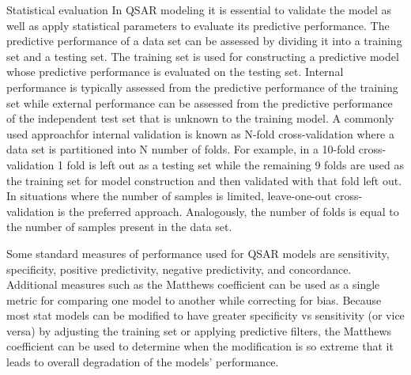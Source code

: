 Statistical evaluation In QSAR modeling it is essential to validate the model as well as apply statistical parameters to evaluate its predictive performance. The predictive performance of a data set can be assessed by dividing it into a training set and a testing set. The training set is used for constructing a predictive model whose predictive performance is evaluated on the testing set. Internal performance is typically assessed from the predictive performance of the training set while external performance can be assessed from the predictive performance of the independent test set that is unknown to the training model. A commonly used approachfor internal validation is known as N-fold cross-validation where a data set is partitioned into N number of folds. For example, in a 10-fold cross-validation 1 fold is left out as a testing set while the remaining 9 folds are used as the training set for model construction and then validated with that fold left out. In situations where the number of samples is limited, leave-one-out cross-validation is the preferred approach. Analogously, the number of folds is equal to the number of samples present in the data set. \cite{Nantasenamat2009}

Some standard measures of performance used for QSAR models are sensitivity, specificity, positive predictivity, negative predictivity, and concordance. Additional measures such as the Matthews coefficient can be used as a single metric for comparing one model to another while correcting for bias. Because most stat models can be modified to have greater specificity vs sensitivity (or vice versa) by adjusting the training set or applying predictive filters, the Matthews coefficient can be used to determine when the modification is so extreme that it leads to overall degradation of the models’ performance.\cite{Kruhlak2012}



